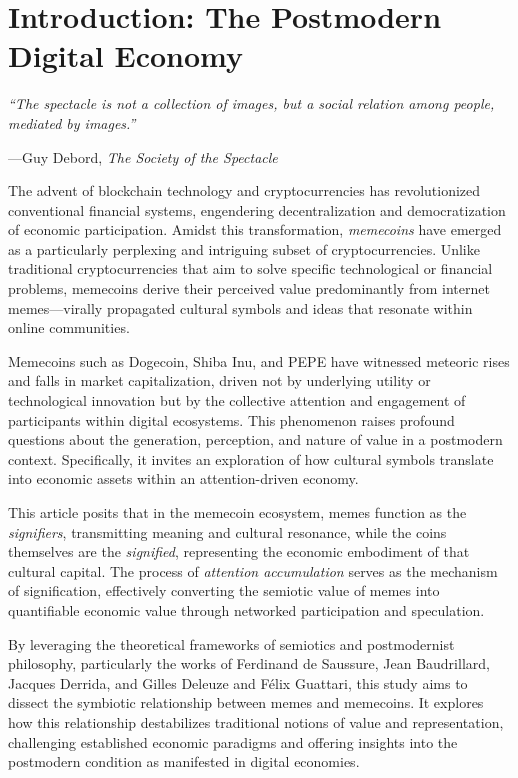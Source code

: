 \documentclass[a4paper,12pt]{article}
\begin{document}
\section{Introduction: The Postmodern Digital Economy}

\epigraph{\textit{“The spectacle is not a collection of images, but a social relation among people, mediated by images.”}}{---Guy Debord, \textit{The Society of the Spectacle}}

The advent of blockchain technology and cryptocurrencies has revolutionized conventional financial systems, engendering decentralization and democratization of economic participation. Amidst this transformation, \textit{memecoins} have emerged as a particularly perplexing and intriguing subset of cryptocurrencies. Unlike traditional cryptocurrencies that aim to solve specific technological or financial problems, memecoins derive their perceived value predominantly from internet memes—virally propagated cultural symbols and ideas that resonate within online communities. 

Memecoins such as Dogecoin, Shiba Inu, and PEPE have witnessed meteoric rises and falls in market capitalization, driven not by underlying utility or technological innovation but by the collective attention and engagement of participants within digital ecosystems. This phenomenon raises profound questions about the generation, perception, and nature of value in a postmodern context. Specifically, it invites an exploration of how cultural symbols translate into economic assets within an attention-driven economy.

This article posits that in the memecoin ecosystem, memes function as the \textit{signifiers}, transmitting meaning and cultural resonance, while the coins themselves are the \textit{signified}, representing the economic embodiment of that cultural capital. The process of \textit{attention accumulation} serves as the mechanism of signification, effectively converting the semiotic value of memes into quantifiable economic value through networked participation and speculation.

By leveraging the theoretical frameworks of semiotics and postmodernist philosophy, particularly the works of Ferdinand de Saussure, Jean Baudrillard, Jacques Derrida, and Gilles Deleuze and Félix Guattari, this study aims to dissect the symbiotic relationship between memes and memecoins. It explores how this relationship destabilizes traditional notions of value and representation, challenging established economic paradigms and offering insights into the postmodern condition as manifested in digital economies.
\end{document}

